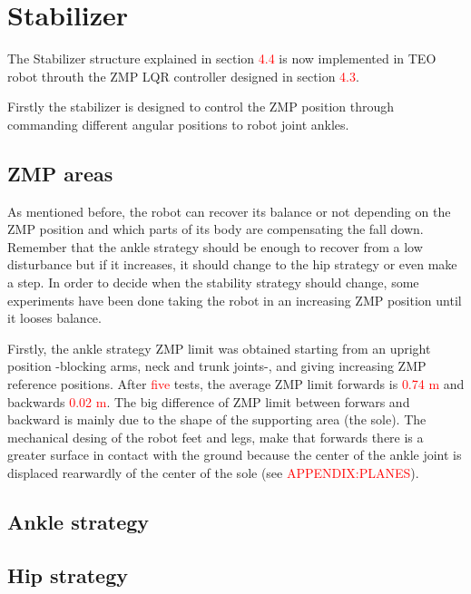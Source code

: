 \section{Stabilizer}
The Stabilizer structure explained in section \textcolor{red}{4.4} is now implemented in TEO robot throuth the ZMP LQR controller designed in section \textcolor{red}{4.3}. 

Firstly the stabilizer is designed to control the ZMP position through commanding different angular positions to robot joint ankles.

\subsection{ZMP areas}
As mentioned before, the robot can recover its balance or not depending on the ZMP position and which parts of its body are compensating the fall down. Remember that the ankle strategy should be enough to recover from a low disturbance but if it increases, it should change to the hip strategy or even make a step. In order to decide when the stability strategy should change, some experiments have been done taking the robot in an increasing ZMP position until it looses balance. 

Firstly, the ankle strategy ZMP limit was obtained starting from an upright position -blocking arms, neck and trunk joints-, and giving increasing ZMP reference positions. After \textcolor{red}{five} tests, the average ZMP limit forwards is \textcolor{red}{0.74 m} and backwards \textcolor{red}{0.02 m}. The big difference of ZMP limit between forwars and backward is mainly due to the shape of the supporting area (the sole). The mechanical desing of the robot feet and legs, make that forwards there is a greater surface in contact with the ground because the center of the ankle joint is displaced rearwardly of the center of the sole (see \textcolor{red}{APPENDIX:PLANES}).

\subsection{Ankle strategy}


\subsection{Hip strategy}

